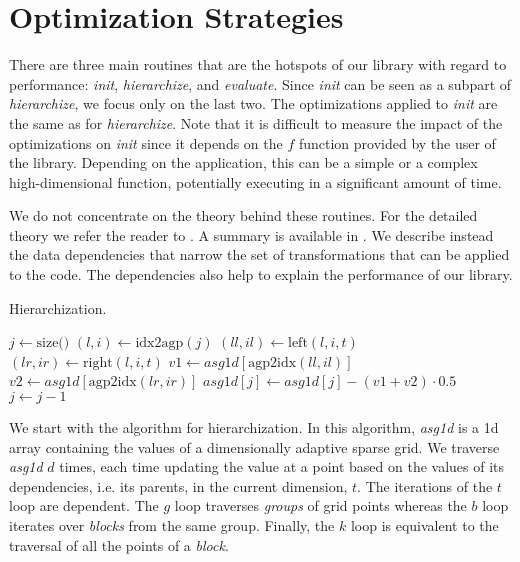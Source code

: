 \section{Optimization Strategies}

There are three main routines that are the hotspots of our library with regard to performance: \textit{init}, \textit{hierarchize}, and \textit{evaluate}. Since \textit{init} can be seen as a subpart of \textit{hierarchize}, we focus only on the last two. The optimizations applied to \textit{init} are the same as for \textit{hierarchize}. Note that it is difficult to measure the impact of the optimizations on \textit{init} since it depends on the $f$ function provided by the user of the library. Depending on the application, this can be a simple or a complex high-dimensional function, potentially executing in a significant amount of time. 

We do not concentrate on the theory behind these routines. For the detailed theory we refer the reader to \cite{bungartz2004}. A summary is available in \cite{murarasu2011}. We describe instead the data dependencies that narrow the set of transformations that can be applied to the code. The dependencies also help to explain the performance of our library.

\begin{algorithm}[tbp]
\small{
 \caption{Hierarchization.}
 \label{alg:hierarchization}                       
 \begin{algorithmic}[1]
		\STATE $j \leftarrow \text{size()}$
					\STATE $\boxed{(l, i) \leftarrow \text{idx2agp}(j)}$
					\STATE $(\textit{ll}, \textit{il}) \leftarrow \text{left}(l, i, t)$
					\STATE $(\textit{lr}, \textit{ir}) \leftarrow \text{right}(l, i, t)$
					\STATE $\boxed{\textit{v1} \leftarrow \textit{asg1d}[\text{agp2idx}(\textit{ll}, \textit{il})]}$
					\STATE $\boxed{\textit{v2} \leftarrow \textit{asg1d}[\text{agp2idx}(\textit{lr}, \textit{ir})]}$
					\STATE $\textit{asg1d}[j] \leftarrow \textit{asg1d}[j] - (\textit{v1} + \textit{v2}) \cdot 0.5$
					\STATE $j \leftarrow j - 1$
				\ENDFOR
			\ENDFOR
		\ENDFOR
    \ENDFOR
 \end{algorithmic}
}
\end{algorithm}

We start with the algorithm for hierarchization. In this algorithm, \textit{asg1d} is a 1d array containing the values of a dimensionally adaptive sparse grid. We traverse \textit{asg1d} $d$ times, each time updating the value at a point based on the values of its dependencies, i.e. its parents, in the current dimension, $t$. The iterations of the $t$ loop 
are dependent. The $g$ loop traverses \textit{groups} of grid points whereas the $b$ loop iterates over \textit{blocks} from the same group. Finally, the $k$ loop is equivalent to the traversal of all the points of a \textit{block}.

